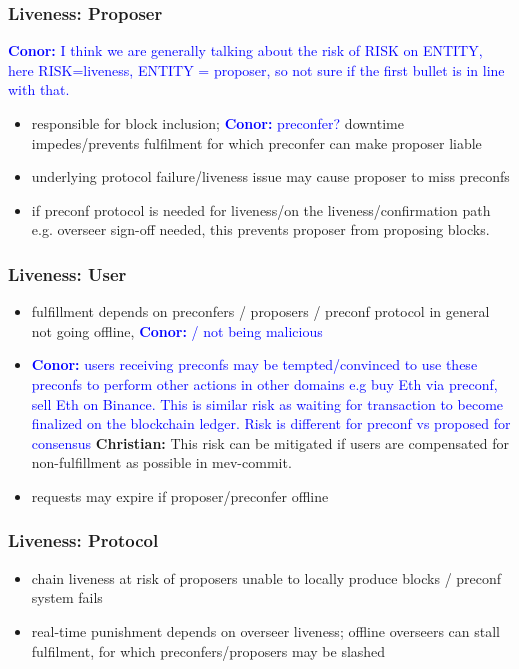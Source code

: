 \documentclass[a4paper]{article}
\theoremstyle{boldstyle}
\newcommand{\cm}[1]{\textcolor{blue}{\textbf{Conor:} #1}}
\newcommand{\chm}[1]{\textcolor{OliveGreen}{\textbf{Christian:} #1}}
\begin{document}
    \subsubsection{Liveness: Proposer}
    \cm{I think we are generally talking about the risk of RISK on ENTITY, here RISK=liveness, ENTITY = proposer, so not sure if the first bullet is in line with that. }
        \begin{itemize}
            \item responsible for block inclusion; \cm{preconfer?} downtime impedes/prevents fulfilment for which preconfer can make proposer liable
            \item underlying protocol failure/liveness issue may cause proposer to miss preconfs
            \item if preconf protocol is needed for liveness/on the liveness/confirmation path e.g. overseer sign-off needed, this prevents proposer from proposing blocks.
        \end{itemize}
    
    \subsubsection{Liveness: User}
        \begin{itemize}
            \item fulfillment depends on preconfers / proposers / preconf protocol in general not going offline, \cm{ / not being malicious}
            \item \cm{users receiving preconfs may be tempted/convinced to use these preconfs to perform other actions in other domains e.g buy Eth via preconf, sell Eth on Binance. This is similar risk as waiting for transaction to become finalized on the blockchain ledger. Risk is different for preconf vs proposed for consensus} \chm{This risk can be mitigated if users are compensated for non-fulfillment as possible in mev-commit.}
            \item requests may expire if proposer/preconfer offline 
        \end{itemize}
    
    \subsubsection{Liveness: Protocol}
        \begin{itemize}
            \item chain liveness at risk of proposers unable to locally produce blocks / preconf system fails
            \item real-time punishment depends on overseer liveness; offline overseers can stall fulfilment, for which preconfers/proposers may be slashed
        \end{itemize}
\end{document}
